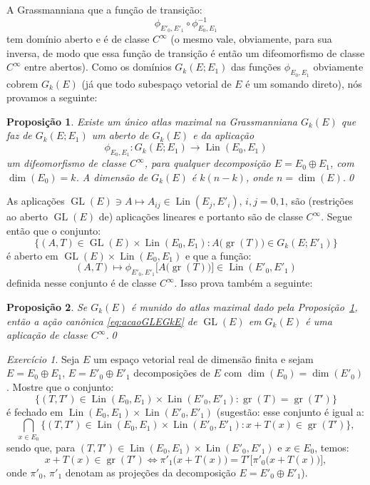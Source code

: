 \documentclass[oneside,11pt]{amsart}
\DeclareMathOperator{\Gr}{gr}
\DeclareMathOperator{\Lin}{Lin}
\DeclareMathOperator{\Dim}{dim}
\DeclareMathOperator{\GL}{GL}
\theoremstyle{remark}\newtheorem{exercise}{Exercício}[section]
\theoremstyle{plain}\newtheorem{teo}{Teorema}[section]
\theoremstyle{plain}\newtheorem{lem}[teo]{Lema}
\theoremstyle{plain}\newtheorem{prop}[teo]{Proposição}
\theoremstyle{definition}\newtheorem{defin}[teo]{Definição}
\theoremstyle{remark}\newtheorem{rem}[teo]{Observação}
\theoremstyle{definition}\newtheorem{example}[teo]{Exemplo}
\numberwithin{equation}{section}
\begin{document}
\begin{section}{A Grassmanniana}
que a função de transição:
\[\phi_{E'_0,E'_1}\circ\phi_{E_0,E_1}^{-1}\]
tem domínio aberto e é de classe $C^\infty$
(o mesmo vale, obviamente, para sua inversa, de modo que essa função de transição é então um difeomorfismo de classe
$C^\infty$ entre abertos). Como os domínios $G_k(E;E_1)$ das funções $\phi_{E_0,E_1}$ obviamente cobrem $G_k(E)$
(já que todo subespaço vetorial de $E$ é um somando direto), nós provamos a seguinte:
\begin{prop}\label{thm:propGrassm}
Existe um único atlas maximal na Grassmanniana $G_k(E)$ que faz de $G_k(E;E_1)$ um aberto de $G_k(E)$ e da aplicação
\[\phi_{E_0,E_1}:G_k(E;E_1)\longrightarrow\Lin(E_0,E_1)\]
um difeomorfismo de classe $C^\infty$, para qualquer decomposição
$E=E_0\oplus E_1$, com $\Dim(E_0)=k$. A dimensão de $G_k(E)$ é $k(n-k)$, onde $n=\Dim(E)$.\qed
\end{prop}

As aplicações $\GL(E)\ni A\longmapsto A_{ij}\in\Lin(E_j,E'_i)$, $i,j=0,1$, são (restrições ao aberto $\GL(E)$ de)
aplicações lineares e portanto são de classe $C^\infty$. Segue então que o conjunto:
\[\big\{(A,T)\in\GL(E)\times\Lin(E_0,E_1):A\big(\!\Gr(T)\big)\in G_k(E;E'_1)\big\}\]
é aberto em $\GL(E)\times\Lin(E_0,E_1)$ e que a função:
\[(A,T)\longmapsto\phi_{E'_0,E'_1}\big[A\big(\!\Gr(T)\big)\big]\in\Lin(E'_0,E'_1)\]
definida nesse conjunto é de classe $C^\infty$. Isso prova também a seguinte:
\begin{prop}
Se $G_k(E)$ é munido do atlas maximal dado pela Proposição~\ref{thm:propGrassm}, então a ação canônica
\eqref{eq:acaoGLEGkE} de $\GL(E)$ em $G_k(E)$ é uma aplicação de classe $C^\infty$.\qed
\end{prop}

\begin{exercise}\label{exe:LemaGrassHauss}
Seja $E$ um espaço vetorial real de dimensão finita e sejam $E=E_0\oplus E_1$, $E=E'_0\oplus E'_1$
decomposições de $E$ com $\Dim(E_0)=\Dim(E'_0)$. Mostre que o conjunto:
\[\big\{(T,T')\in\Lin(E_0,E_1)\times\Lin(E'_0,E'_1):\Gr(T)=\Gr(T')\big\}\]
é fechado em $\Lin(E_0,E_1)\times\Lin(E'_0,E'_1)$ (sugestão: esse conjunto é igual a:
\[\bigcap_{x\in E_0}\big\{(T,T')\in\Lin(E_0,E_1)\times\Lin(E'_0,E'_1):x+T(x)\in\Gr(T')\big\},\]
sendo que, para $(T,T')\in\Lin(E_0,E_1)\times\Lin(E'_0,E'_1)$ e $x\in E_0$, temos:
\[x+T(x)\in\Gr(T')\Longleftrightarrow\pi'_1\big(x+T(x)\big)=T'\big[\pi'_0\big(x+T(x)\big)\big],\]
onde $\pi'_0$, $\pi'_1$ denotam as projeções da decomposição $E=E'_0\oplus E'_1$).
\end{exercise}


\end{section}
\end{document}
